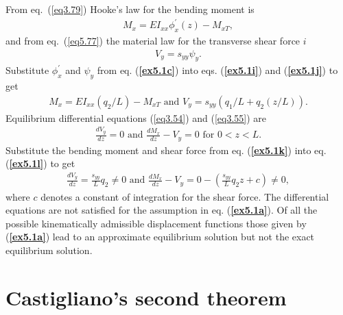 \documentclass{AeroStructure-ERJohnson}
\begin{document}
\begin{example}
From eq.~(\ref{eq3.79}) Hooke's law for the bending moment is
\begin{align}\label{ex5.1i}
M_{x}=E I_{x x} \phi_{x}^{\prime}(z)-M_{x T},
\end{align}
and from eq.~(\ref{eq5.77}) the material law for the transverse shear force $i$
\begin{align}\label{ex5.1j}
V_{y}=s_{y y} \psi_{y}.
\end{align}
Substitute $\phi_{x}^{\prime}$ and $\psi_{y}$ from eq. ({\bf\ref{ex5.1c}}) into eqs. ({\bf\ref{ex5.1i}}) and ({\bf\ref{ex5.1j}}) to get
\begin{align}\label{ex5.1k}
M_{x}=E I_{x x}\left(q_{2} / L\right)-M_{x T}\mbox{ and }V_{y}=s_{y y}\left(q_{1} / L+q_{2}(z / L)\right).
\end{align}
Equilibrium differential equations (\ref{eq3.54}) and (\ref{eq3.55}) are
\begin{align}\label{ex5.1l}
\frac{d V_{y}}{d z}=0\mbox{ and }\frac{d M_{x}}{d z}-V_{y}=0\mbox{ for }0<z<L.
\end{align}
Substitute the bending moment and shear force from eq. ({\bf\ref{ex5.1k}}) into eq. ({\bf\ref{ex5.1l}}) to get
\begin{align}\label{ex5.1m}
\frac{d V_{y}}{d z}=\frac{s_{y y}}{L} q_{2} \neq 0\mbox{ and }\frac{d M_{x}}{d z}-V_{y}=0-\left(\frac{s_{y y}}{L} q_{2} z+c\right) \neq 0,
\end{align}
where $c$ denotes a constant of integration for the shear force. The differential equations are not satisfied for the assumption in eq. ({\bf\ref{ex5.1a}}). Of all the possible kinematically admissible displacement functions those given by ({\bf\ref{ex5.1a}}) lead to an approximate equilibrium solution but not the exact equilibrium solution.
\end{example}\setcounter{equation}{87}

\vspace*{-15pt}

\section{Castigliano's second theorem}\label{sec5.8}
\end{document}
